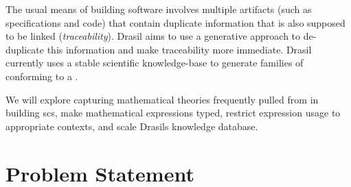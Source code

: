 The usual means of building software involves multiple artifacts (such as
specifications and code) that contain duplicate information that is also
supposed to be linked (\textit{traceability}). Drasil aims to use a generative
approach to de-duplicate this information and make traceability more immediate.
Drasil currently uses a stable scientific knowledge-base to generate families of
 conforming to a \cite{SmithAndLai2005}.

\iffalse
      The usual means of building software involves multiple artifacts (such as
      specifications and code) that contain duplicate information that is
      supposed to be linked (\textit{traceability}). Drasil aims to capture the
      information and knowledge necessary to create these artifacts, and
      re-generate the artifacts, making traceability more immediate.

      A common thread of knowledge links together all software artifacts.
      Software developers pull on this thread to produce software artifacts, but
      the thread is lost on the authors, isn't effectively shared, and artifacts
      quickly becomes out of date as more is understood or requirements changed.
      Typically, this knowledge is duplicated across many artifacts (such as
      specifications and code). Through codifying domain knowledge,
      Drasil\cite{Drasil2021} aims to use a generative approach to
      \textit{de-duplicate} this information, and generate software artifacts
      that are \textit{traceable}, \textit{reusable}, \textit{maintainable}, and
      \textit{consistent}, against a stable body of knowledge. Drasil currently
      focuses on \ACF{scs} conforming to a specific \ACF{srs}
      template\cite{SmithAndLai2005}.
\fi

We will explore capturing mathematical theories frequently pulled from in
building \acs{scs}, make mathematical expressions typed, restrict expression
usage to appropriate contexts, and scale Drasils knowledge database.

\section{Problem Statement}
\label{sec:intro:problemStatement}

